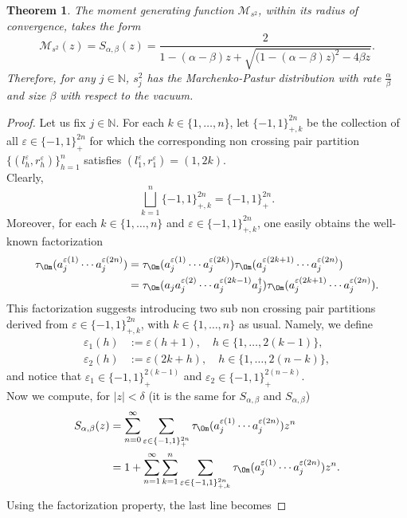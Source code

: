 \documentclass[12pt]{amsart}
\numberwithin{equation}{section}
\def\cam{{\mathcal M}}
\def\bn{{\mathbb N}}
\def\a{\alpha}
\def\b{\beta}
\def\eps{\varepsilon}
\def\t{\tau}
\newtheorem{thm}{Theorem}[section]
\theoremstyle{definition}
\begin{document}
\begin{thm}\label{MarPa}
The moment generating function $\cam_{s^2}$, within its radius of convergence, takes the form
\begin{equation}\label{MP}
\cam_{s^2}(z) = S_{\a,\b}(z) = \frac{2}{1 - (\a-\b)z + \sqrt{\big(1 - (\a-\b)z\big)^2 - 4\b z}}.
\end{equation}
Therefore, for any $j\in\bn$, $s_j^2$ has the Marchenko-Pastur distribution with rate $\frac{\a}{\b}$ and size $\b$ with respect to the vacuum.
\end{thm}
\begin{proof}
  Let us fix $j\in\bn$. For each $k\in\{1,\ldots,n\}$, let $\{-1,1\}^{2n}_{+,k}$ be the collection of all $\eps\in\{-1,1\}^{2n}_{+}$ for which the corresponding non crossing pair partition $\{(l^\eps_h,r^\eps_h)\}_{h=1}^n$ satisfies {$(l^\eps_1,r^\eps_1)=(1,2k)$}.\\
Clearly,
\[
\bigsqcup_{k=1}^n \{-1,1\}^{2n}_{+,k} = \{-1,1\}^{2n}_+.
\]
Moreover, for each $k\in\{1,\ldots,n\}$ and $\eps\in\{-1,1\}^{2n}_{+,k}$, one easily obtains the well-known factorization
\begin{align}\label{facto}
\t_\Om(a_j^{\eps(1)} \cdots a_j^{\eps(2n)})
&= \t_\Om(a_j^{\eps(1)} \cdots a_j^{\eps(2k)})
  \t_\Om(a_j^{\eps(2k+1)} \cdots a_j^{\eps(2n)}) \\
&= \t_\Om(a_j a_j^{\eps(2)} \cdots a_j^{\eps(2k-1)} a_j^\dag) \t_\Om (a_j^{\eps(2k+1)} \cdots a_j^{\eps(2n)}).
\end{align}
This factorization suggests introducing two sub non crossing pair partitions derived from $\eps\in\{-1,1\}^{2n}_{+,k}$, with $k\in\{1,\ldots,n\}$ as usual. Namely, we define
\begin{align*}
\eps_1(h) &:= \eps(h+1), \quad h\in\{1,\ldots,2(k-1)\}, \\
\eps_2(h) &:= \eps(2k+h), \quad h\in\{1,\ldots,2(n-k)\},
\end{align*}
and notice that $\eps_1 \in \{-1,1\}^{2(k-1)}_+$ and $\eps_2 \in \{-1,1\}^{2(n-k)}_+$.\\
Now we compute, for $|z|<\delta$ (it is the same for $S_{\a,\b}$ and $S_{\a,\b}$)
\begin{align*}
S_{\a,\b}(z)
&= \sum_{n=0}^\infty \sum_{\eps\in \{-1,1\}^{2n}_+} \t_\Om( a_j^{\eps(1)} \cdots a_j^{\eps(2n)}) z^n \\
&= 1+ \sum_{n=1}^\infty \sum_{k=1}^n \sum_{\eps\in \{-1,1\}^{2n}_{+,k}} \t_\Om( a_j^{\eps(1)} \cdots a_j^{\eps(2n)}) z^n.
\end{align*}
Using the factorization property, the last line becomes

\end{proof}
\end{document}
